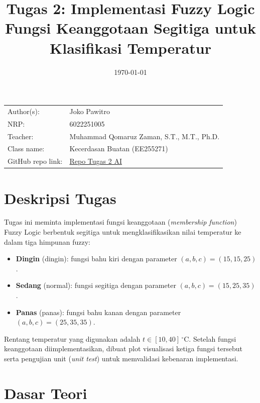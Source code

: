 \documentclass{article}
\title{Tugas 2: Implementasi Fuzzy Logic\\
  \large Fungsi Keanggotaan Segitiga untuk Klasifikasi Temperatur}
\date{\today}
\begin{document}
\maketitle

\noindent\begin{tabular}{@{}ll}
  Author(s):       & Joko Pawitro\\
  NRP:             & 6022251005\\
  Teacher:         & Muhammad Qomaruz Zaman, S.T., M.T., Ph.D.\\
  Class name:      & Kecerdasan Buatan (EE255271)\\
  GitHub repo link:& \href{https://github.com/jpawitro/reb_2025_2026_genap_EE255271_kecerdasan_buatan_tugas_02}{Repo Tugas 2 AI}
\end{tabular}
\vspace{0.8cm}

\section*{Deskripsi Tugas}

Tugas ini meminta implementasi fungsi keanggotaan (\textit{membership function})
Fuzzy Logic berbentuk segitiga untuk mengklasifikasikan nilai temperatur ke dalam
tiga himpunan fuzzy:

\begin{itemize}
  \item \textbf{Dingin} (dingin): fungsi bahu kiri dengan parameter $(a, b, c) = (15, 15, 25)$.
  \item \textbf{Sedang} (normal): fungsi segitiga dengan parameter $(a, b, c) = (15, 25, 35)$.
  \item \textbf{Panas} (panas): fungsi bahu kanan dengan parameter $(a, b, c) = (25, 35, 35)$.
\end{itemize}

Rentang temperatur yang digunakan adalah $t \in [10, 40]\,^{\circ}\mathrm{C}$. Setelah
fungsi keanggotaan diimplementasikan, dibuat plot visualisasi ketiga fungsi tersebut
serta pengujian unit (\textit{unit test}) untuk memvalidasi kebenaran implementasi.

\section*{Dasar Teori}
\end{document}
